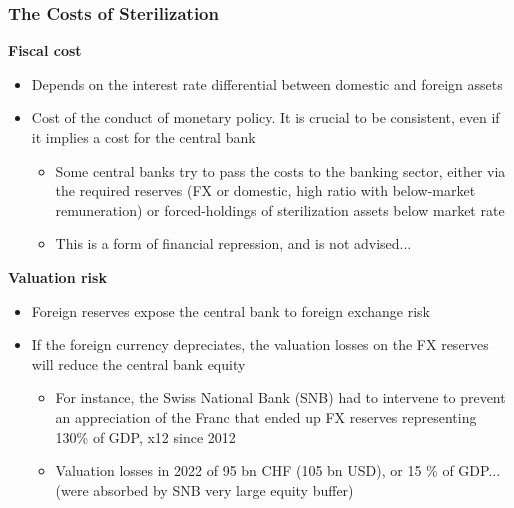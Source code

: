 \documentclass{beamer}
\newenvironment{wideitemize}{\itemize\addtolength{\itemsep}{10pt}}{\enditemize}
\begin{document}
\begin{frame}
  \frametitle{The Costs of Sterilization}
  \begin{wideitemize}
    
  \item \textbf{Fiscal cost}
    \begin{itemize}
    \item Depends on the interest rate differential between domestic and foreign assets
    \item Cost of the conduct of monetary policy. It is crucial to be consistent, even if it implies a cost for the central bank
      \begin{itemize}
      \item Some central banks try to pass the costs to the banking sector, either via the required reserves (FX or domestic, high ratio with below-market remuneration) or forced-holdings of sterilization assets below market rate
      \item This is a form of financial repression, and is not advised...
      \end{itemize}
    \end{itemize}
    
  \item \textbf{Valuation risk}
    \begin{itemize}
    \item Foreign reserves expose the central bank to foreign exchange risk
    \item If the foreign currency depreciates, the valuation losses on the FX reserves will reduce the central bank equity
      \begin{itemize}
      \item For instance, the Swiss National Bank (SNB) had to intervene to prevent an appreciation of the Franc that ended up FX reserves representing 130\% of GDP, x12 since 2012
       \item Valuation losses in 2022 of 95 bn CHF (105 bn USD), or 15 \% of GDP... (were absorbed by SNB very large equity buffer)
      \end{itemize}
    \end{itemize}
    
  \end{wideitemize}
\end{frame}
\end{document}
